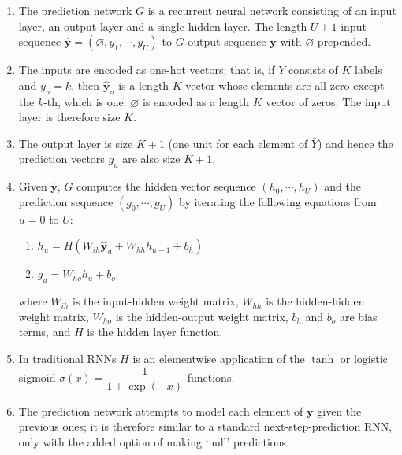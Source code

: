 \begin{enumerate}
    \item The prediction network $G$ is a recurrent neural network consisting of an input layer, an output layer and a single hidden layer.
    The length $U + 1$ input sequence $\hat{\bm{y}} = (\varnothing, y_1, \cdots , y_U )$ to $G$ output sequence $\bm{y}$ with $\varnothing$ prepended. 
    \hfill \cite{arxiv/1211.3711/Sequence-Transduction-RNN}
    
    \item The inputs are encoded as one-hot vectors; that is, if $Y$ consists of $K$ labels and $y_u = k$, then $\hat{\bm{y}}_u$ is a length $K$ vector whose elements are all zero except the $k$-th, which is one. 
    $\varnothing$ is encoded as a length $K$ vector of zeros.
    The input layer is therefore size $K$. 
    \hfill \cite{arxiv/1211.3711/Sequence-Transduction-RNN}

    \item The output layer is size $K + 1$ (one unit for each element of $\bar{Y}$) and hence the prediction vectors $g_u$ are also size $K + 1$.
    \hfill \cite{arxiv/1211.3711/Sequence-Transduction-RNN}

    \item Given $\hat{\bm{y}}$, $G$ computes the hidden vector sequence $(h_0, \cdots , h_U )$ and the prediction sequence $(g_0, \cdots , g_U )$ by iterating the following equations from $u = 0$ to $U $:
    \hfill \cite{arxiv/1211.3711/Sequence-Transduction-RNN}
    \begin{multicols}{2}
    \begin{enumerate}
        \item $h_u = H (W_{ih} \hat{\bm{y}}_u + W_{hh}h_{u-1} + b_h)$
        \hfill \cite{arxiv/1211.3711/Sequence-Transduction-RNN}

        \item $g_u = W_{ho}h_u + b_o $
        \hfill \cite{arxiv/1211.3711/Sequence-Transduction-RNN}
    \end{enumerate}
    \end{multicols}
    where $W_{ih}$ is the input-hidden weight matrix, 
    $W_{hh}$ is the hidden-hidden weight matrix, 
    $W_{ho}$ is the hidden-output weight matrix, 
    $b_h$ and $b_o$ are bias terms, 
    and $H$ is the hidden layer function. 
    \hfill \cite{arxiv/1211.3711/Sequence-Transduction-RNN}

    \item In traditional RNNs $H$ is an elementwise application of the $\tanh$ or logistic sigmoid $\sigma(x) = \dfrac{1}{1 + \exp(-x)}$ functions.
    \hfill \cite{arxiv/1211.3711/Sequence-Transduction-RNN}

    \item The prediction network attempts to model each element of $\bm{y}$ given the previous ones; it is therefore similar to a standard next-step-prediction RNN, only with the added option of making ‘null’ predictions.
    \hfill \cite{arxiv/1211.3711/Sequence-Transduction-RNN}
\end{enumerate}


